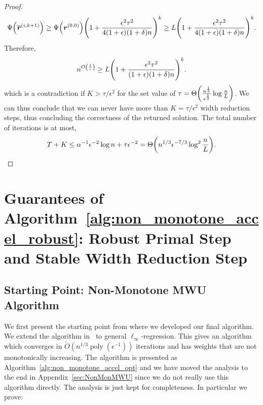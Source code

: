\documentclass[11pt]{article}
\let\originalleft\left
\let\originalright\right
\renewcommand{\left}{\mathopen{}\mathclose\bgroup\originalleft}
\renewcommand{\right}{\aftergroup\egroup\originalright}
\newcommand\rr{\boldsymbol{\mathit{r}}}
\newcommand\rrbar{\overline{\boldsymbol{\mathit{r}}}}
\newcommand{\wt}{\widetilde}
\DeclareMathOperator*{\poly}{{\mathrm{poly}}}
\begin{document}
\begin{proof}
\[
 {\Psi\left({\rrbar^{(i,k+1)}}\right)} \geq {\Psi\left({\rr^{(0,0)}}\right)}\left(1  +  \frac{\epsilon^2 \tau^2}{4(1+\epsilon)(1+\delta) n}\right)^k\geq  L\left(1  +  \frac{\epsilon^2 \tau^2}{4(1+\epsilon)(1+\delta) n}\right)^k .
\]
Therefore,
\[
n^{O\left(\frac{1}{\epsilon} \right)}\geq  L \left(1  +  \frac{\epsilon^2 \tau^2}{(1+\epsilon)(1+\delta) n}\right)^k.
\]
which is a contradiction if $K> \tau/\epsilon^2$ for the set value of $\tau =  \Theta\left(\frac{n^{\frac{1}{3}}}{\epsilon^{\frac{1}{3}}} \log\frac{n}{L}\right)$. We can thus conclude that we can never have more than $K = \tau/\epsilon^2$ width reduction steps, thus concluding the correctness of the returned solution. The total number of iterations is at most,
\[
T + K \leq \alpha^{-1}\epsilon^{-2}\log n+  \tau \epsilon^{-2} = \Theta\left(n^{1/3}\epsilon^{-7/3}\log^2\frac{n}{L}\right).
\]
\end{proof}


 \section{Guarantees of Algorithm~\ref{alg:non_monotone_accel_robust}: Robust Primal Step and Stable Width Reduction Step}\label{sec:Appendix_non_monotone_robust}

\subsection{Starting Point: Non-Monotone MWU Algorithm}
We first present the starting point from where we developed our final algorithm. We extend the algorithm in~\cite{madry2016computing} to general $\ell_{\infty}$-regression. This gives an algorithm which converges in $\wt{O}(n^{1/3} \poly(\epsilon^{-1}))$ iterations and has weights that are not monotonically increasing. The algorithm is presented as Algorithm~\ref{alg:non_monotone_accel_opt} and we have moved the analysis to the end in Appendix~\ref{sec:NonMonMWU} since we do not really use this algorithm directly. The analysis is just kept for completeness. In particular we prove:
\end{document}
